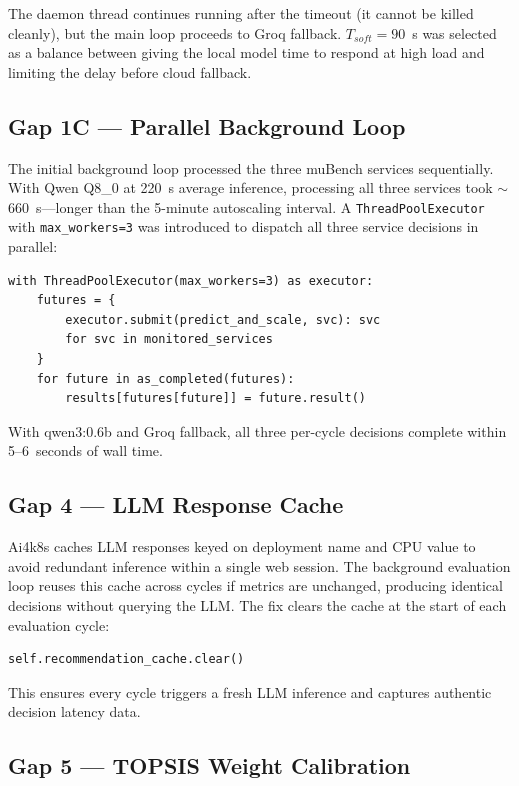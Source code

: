 The daemon thread continues running after the timeout (it cannot be killed cleanly),
but the main loop proceeds to Groq fallback. $T_{soft} = 90$~s was selected as a
balance between giving the local model time to respond at high load and limiting
the delay before cloud fallback.

\subsection{Gap 1C — Parallel Background Loop}
\label{sec:gap1c}

The initial background loop processed the three muBench services sequentially.
With Qwen Q8\_0 at 220~s average inference, processing all three services took
$\sim$660~s—longer than the 5-minute autoscaling interval. A
\texttt{ThreadPoolExecutor} with \texttt{max\_workers=3} was introduced to
dispatch all three service decisions in parallel:

\begin{verbatim}
with ThreadPoolExecutor(max_workers=3) as executor:
    futures = {
        executor.submit(predict_and_scale, svc): svc
        for svc in monitored_services
    }
    for future in as_completed(futures):
        results[futures[future]] = future.result()
\end{verbatim}

With qwen3:0.6b and Groq fallback, all three per-cycle decisions complete within
5--6~seconds of wall time.

\subsection{Gap 4 — LLM Response Cache}
\label{sec:gap4}

Ai4k8s caches LLM responses keyed on deployment name and CPU value to avoid
redundant inference within a single web session. The background evaluation loop
reuses this cache across cycles if metrics are unchanged, producing identical
decisions without querying the LLM. The fix clears the cache at the start of
each evaluation cycle:

\begin{verbatim}
self.recommendation_cache.clear()
\end{verbatim}

This ensures every cycle triggers a fresh LLM inference and captures authentic
decision latency data.

\subsection{Gap 5 — TOPSIS Weight Calibration}
\label{sec:weight-study}


